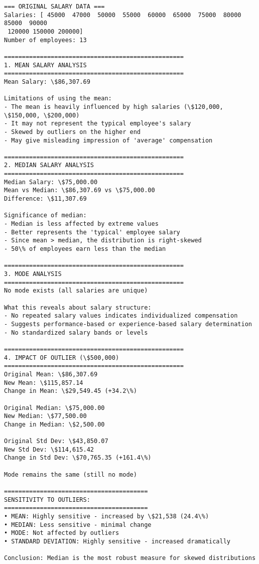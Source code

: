 \documentclass[11pt]{article}
\begin{document}
    \begin{Verbatim}[commandchars=\\\{\}]
=== ORIGINAL SALARY DATA ===
Salaries: [ 45000  47000  50000  55000  60000  65000  75000  80000  85000  90000
 120000 150000 200000]
Number of employees: 13

==================================================
1. MEAN SALARY ANALYSIS
==================================================
Mean Salary: \$86,307.69

Limitations of using the mean:
- The mean is heavily influenced by high salaries (\$120,000, \$150,000, \$200,000)
- It may not represent the typical employee's salary
- Skewed by outliers on the higher end
- May give misleading impression of 'average' compensation

==================================================
2. MEDIAN SALARY ANALYSIS
==================================================
Median Salary: \$75,000.00
Mean vs Median: \$86,307.69 vs \$75,000.00
Difference: \$11,307.69

Significance of median:
- Median is less affected by extreme values
- Better represents the 'typical' employee salary
- Since mean > median, the distribution is right-skewed
- 50\% of employees earn less than the median

==================================================
3. MODE ANALYSIS
==================================================
No mode exists (all salaries are unique)

What this reveals about salary structure:
- No repeated salary values indicates individualized compensation
- Suggests performance-based or experience-based salary determination
- No standardized salary bands or levels

==================================================
4. IMPACT OF OUTLIER (\$500,000)
==================================================
Original Mean: \$86,307.69
New Mean: \$115,857.14
Change in Mean: \$29,549.45 (+34.2\%)

Original Median: \$75,000.00
New Median: \$77,500.00
Change in Median: \$2,500.00

Original Std Dev: \$43,850.07
New Std Dev: \$114,615.42
Change in Std Dev: \$70,765.35 (+161.4\%)

Mode remains the same (still no mode)

========================================
SENSITIVITY TO OUTLIERS:
========================================
• MEAN: Highly sensitive - increased by \$21,538 (24.4\%)
• MEDIAN: Less sensitive - minimal change
• MODE: Not affected by outliers
• STANDARD DEVIATION: Highly sensitive - increased dramatically

Conclusion: Median is the most robust measure for skewed distributions
    \end{Verbatim}
\end{document}
